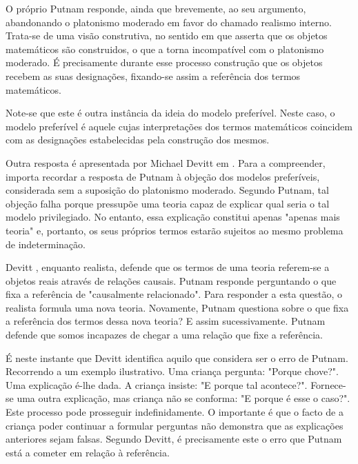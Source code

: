 \documentclass{article}
\begin{document}
O próprio Putnam responde, ainda que brevemente, ao seu argumento, abandonando o platonismo moderado em favor do chamado realismo interno. Trata-se de uma visão construtiva, no sentido em que asserta que os objetos matemáticos são construidos, o que a torna incompatível com o platonismo moderado. É precisamente durante esse processo construção que os objetos recebem as suas designações, fixando-se assim a referência dos termos matemáticos. 

Note-se que este é outra instância da ideia do modelo preferível. Neste caso, o modelo preferível é aquele cujas interpretações dos termos matemáticos coincidem com as designações estabelecidas pela construção dos mesmos.

\vspace{0.5cm}

Outra resposta é apresentada por Michael Devitt em \cite{devitt1984}. Para a compreender, importa recordar a resposta de Putnam à objeção dos modelos preferíveis, considerada sem a suposição do platonismo moderado. Segundo Putnam, tal objeção falha porque pressupõe uma teoria capaz de explicar qual seria o tal modelo privilegiado. No entanto, essa explicação constitui apenas "apenas mais teoria" e, portanto, os seus próprios termos estarão sujeitos ao mesmo problema de indeterminação. 

Devitt , enquanto realista, defende que os termos de uma teoria referem-se a objetos reais através de relações causais. Putnam responde perguntando o que fixa a referência de "causalmente relacionado". Para responder a esta questão, o realista formula uma nova teoria. Novamente, Putnam questiona sobre o que fixa a referência dos termos dessa nova teoria? E assim sucessivamente. Putnam defende que somos incapazes de chegar a uma relação que fixe a referência.

É neste instante que Devitt identifica aquilo que considera ser o erro de Putnam. Recorrendo a um exemplo ilustrativo. Uma criança pergunta: "Porque chove?". Uma explicação é-lhe dada. A criança insiste: "E porque tal acontece?". Fornece-se uma outra explicação, mas criança não se conforma: "E porque é esse o caso?". Este processo pode prosseguir indefinidamente. O importante é que o facto de a criança poder continuar a formular perguntas não demonstra que as explicações anteriores sejam falsas. Segundo Devitt, é precisamente este o erro que Putnam está a cometer em relação à referência.


\vspace{2cm}
\end{document}
